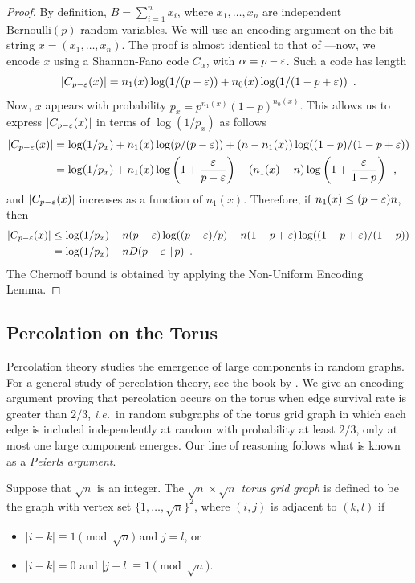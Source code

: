 \documentclass[format=acmsmall, review=false, screen=true]{acmart}
\begin{document}
\begin{proof}
  By definition, $B=\sum_{i=1}^n x_i$, where $x_1,\ldots,x_n$ are
  independent $\mathrm{Bernoulli}(p)$ random variables.  We will use
  an encoding argument on the bit string $x=(x_1,\ldots,x_n)$. The
  proof is almost identical to that of ---now,
  we encode $x$ using a Shannon-Fano code $C_\alpha$, with
  $\alpha = p - \varepsilon$. Such a code has length
  \[
    |C_{p - \varepsilon}(x)| = n_1(x) \log (1/(p - \varepsilon)) + n_0(x) \log (1/(1
    - p + \varepsilon)) \enspace .
  \]
  Now, $x$ appears with probability
  $p_x = p^{n_1(x)} (1 - p)^{n_0(x)}$. This allows us
  to express $|C_{p - \varepsilon}(x)|$ in terms of $\log(1/p_x)$ as follows
  \begin{align*}
    |C_{p - \varepsilon}(x)| &= \log(1/p_x) + 
         n_1(x) \log (p/(p - \varepsilon)) + (n - n_1(x)) \log ((1 - p)/(1 - p + \varepsilon)) \\
         &= \log (1/p_x) + n_1(x) \log \left(1 + \frac{\varepsilon}{p - \varepsilon}\right) + 
(n_1(x) - n) \log \left(1 + \frac{\varepsilon}{1 - p}\right) \enspace ,
  \end{align*}
  and $|C_{p - \varepsilon}(x)|$ increases as a function of
  $n_1(x)$. Therefore, if $n_1(x) \le (p - \varepsilon)n$, then
  \begin{align*}
    |C_{p - \varepsilon}(x)| &\le \log (1/p_x) - n (p - \varepsilon) \log ((p - \varepsilon)/p) - n (1 - p + \varepsilon) \log ((1 - p + \varepsilon)/(1 - p)) \\
                      &= \log (1/p_x) - n D(p - \varepsilon \,\|\, p) \enspace .
  \end{align*}
  The Chernoff bound is obtained by applying the Non-Uniform Encoding
  Lemma.
\end{proof}

\subsection{Percolation on the Torus}

Percolation theory studies the emergence of large components in random
graphs. For a general study of percolation theory, see the book by
.  We give an encoding argument
proving that percolation occurs on the torus when edge survival rate
is greater than $2/3$, \emph{i.e.}~in random subgraphs of the torus
grid graph in which each edge is included independently at random with
probability at least $2/3$, only at most one large component
emerges. Our line of reasoning follows what is known as a
\emph{Peierls argument}.

Suppose that $\sqrt{n}$ is an integer. The \emph{$\sqrt{n} \times \sqrt{n}$
  torus grid graph} is defined to be the graph with vertex set
$\{1, \ldots, \sqrt{n}\}^2$, where $(i, j)$ is adjacent to $(k, l)$
if
\begin{itemize}[topsep=0pt]
\item $|i - k| \equiv 1 \pmod{\sqrt{n}}$ and $j = l$, or
\item $|i - k| = 0$ and $|j - l| \equiv 1 \pmod{\sqrt{n}}$.
\end{itemize}
\end{document}
